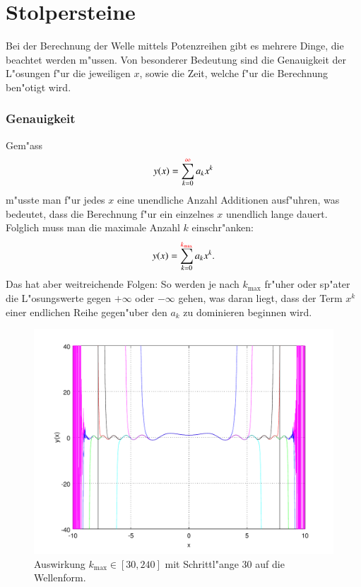 \section{Stolpersteine}
Bei der Berechnung der Welle mittels Potenzreihen gibt es mehrere Dinge, die 
beachtet werden m"ussen. Von besonderer Bedeutung sind die Genauigkeit der 
L"osungen f"ur die jeweiligen $x$, sowie die Zeit, welche f"ur die 
Berechnung ben"otigt wird.

\subsubsection{Genauigkeit}
%
%
Gem"ass
\begin{equation*}
	y(x) = \sum_{k=0}^{\textcolor{red}{\infty}}a_kx^k
\end{equation*}
m"usste man f"ur jedes $x$ eine unendliche Anzahl Additionen ausf"uhren, was 
bedeutet, dass die Berechnung f"ur ein einzelnes $x$ unendlich lange 
dauert. Folglich muss man die maximale Anzahl $k$ einschr"anken:
\begin{equation*}
	y(x) = \sum_{k=0}^{\textcolor{red}{k_{\text{max}}}}a_kx^k.
\end{equation*}
Das hat aber weitreichende Folgen: So werden je nach $k_{\text{max}}$ fr"uher 
oder sp"ater die L"osungswerte gegen $+\infty$ oder $-\infty$ gehen, was daran 
liegt, dass der Term $x^k$ einer endlichen Reihe gegen"uber den $a_k$ zu 
dominieren beginnen wird.

\begin{figure}
	\includegraphics[width=1\hsize]{./wellen/images/kmax/kmax.pdf}
	\caption{Auswirkung $k_{\text{max}} \in [30,240]$ mit Schrittl"ange 30 auf 
	die Wellenform.}
	\label{fig:wellen:variablekmax}
\end{figure}

